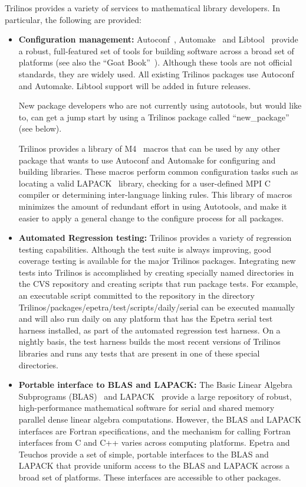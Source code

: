 \documentclass[acmtoms,acmnow]{acmtrans2m}
\begin{document}
Trilinos provides a variety of services to mathematical library
developers.  In particular, the following are provided:
\begin{itemize}
\item {\bf Configuration management:}
Autoconf~\cite{Autoconf},  Automake~\cite{Automake} and
Libtool~\cite{Libtool} provide a robust, full-featured set of tools for
building software across a broad set of platforms (see also the ``Goat
Book''~\cite{GoatBook}).  Although these
tools are not official standards, they are widely used.  All existing
Trilinos packages use Autoconf and Automake.  Libtool support will be
added in future releases. 

New package developers who are not currently using autotools, but would like
to, can get a jump start by using a Trilinos package called
``new\_package'' (see below). 

Trilinos provides a library of M4~\cite{M4} macros that can be used by any other
package that wants to use Autoconf and Automake for configuring and
building libraries.  These macros perform common configuration tasks such as
locating a valid LAPACK~\cite{lapack} library, checking for a
user-defined MPI C compiler or determining inter-language linking
rules.  This library of macros minimizes the amount of redundant
 effort in using Autotools, and make it easier to apply a general change to
the configure process for all packages.

\item {\bf Automated Regression testing:} Trilinos provides a variety of regression
testing capabilities.  Although the test suite is always improving,
good coverage testing is available for the major Trilinos packages.
Integrating new tests into Trilinos is accomplished by creating
specially named directories in the CVS repository and creating scripts
that run package tests.  For example, an executable script committed
to the repository in the directory 
Trilinos/packages/epetra/test/scripts/daily/serial can be executed manually and
will also run daily on any platform that has the Epetra serial test harness
installed, as part of the automated regression test harness.  On a nightly 
basis, the test harness builds the most recent versions of Trilinos libraries 
and runs any tests that are present in one of these special directories.  

\item {\bf Portable interface to BLAS and LAPACK:} The Basic Linear Algebra
Subprograms (BLAS)~\cite{BLAS1,BLAS2,BLAS3} and LAPACK~\cite{lapack}
provide a large repository of robust, high-performance mathematical
software for serial and shared memory parallel dense linear algebra
computations.  However, the BLAS and LAPACK interfaces are Fortran
specifications, and the mechanism for calling Fortran interfaces from
C and C++ varies across computing platforms.  Epetra and Teuchos
provide a set of simple, portable interfaces to the BLAS and LAPACK
that provide uniform access to the BLAS and LAPACK across a broad
set of platforms.  These interfaces are accessible to
other packages.


\end{itemize}
\end{document}
